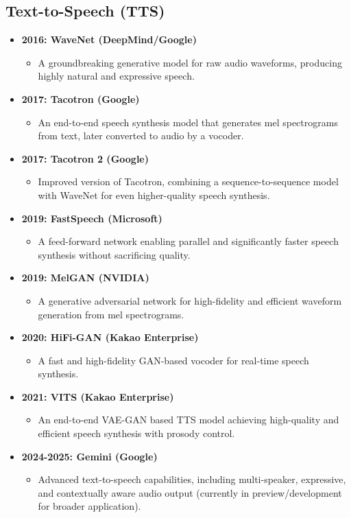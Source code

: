 \documentclass{article}
\begin{document}
\subsection{Text-to-Speech (TTS)}
\begin{itemize}[leftmargin=1.5em]
\item \textbf{2016: WaveNet (DeepMind/Google)}
  \begin{itemize}
    \item A groundbreaking generative model for raw audio waveforms, producing highly natural and expressive speech.
  \end{itemize}
\item \textbf{2017: Tacotron (Google)}
  \begin{itemize}
    \item An end-to-end speech synthesis model that generates mel spectrograms from text, later converted to audio by a vocoder.
  \end{itemize}
\item \textbf{2017: Tacotron 2 (Google)}
  \begin{itemize}
    \item Improved version of Tacotron, combining a sequence-to-sequence model with WaveNet for even higher-quality speech synthesis.
  \end{itemize}
\item \textbf{2019: FastSpeech (Microsoft)}
  \begin{itemize}
    \item A feed-forward network enabling parallel and significantly faster speech synthesis without sacrificing quality.
  \end{itemize}
\item \textbf{2019: MelGAN (NVIDIA)}
  \begin{itemize}
    \item A generative adversarial network for high-fidelity and efficient waveform generation from mel spectrograms.
  \end{itemize}
\item \textbf{2020: HiFi-GAN (Kakao Enterprise)}
  \begin{itemize}
    \item A fast and high-fidelity GAN-based vocoder for real-time speech synthesis.
  \end{itemize}
\item \textbf{2021: VITS (Kakao Enterprise)}
  \begin{itemize}
    \item An end-to-end VAE-GAN based TTS model achieving high-quality and efficient speech synthesis with prosody control.
  \end{itemize}
\item \textbf{2024-2025: Gemini (Google)}
  \begin{itemize}
    \item Advanced text-to-speech capabilities, including multi-speaker, expressive, and contextually aware audio output (currently in preview/development for broader application).
  \end{itemize}
\end{itemize}
\end{document}
